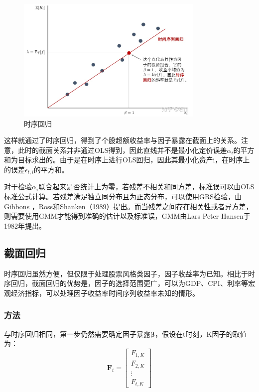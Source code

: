 \documentclass[11pt]{article}
\begin{document}
\begin{figure}[H]
    \centering
    \includegraphics[width=0.8\textwidth]{fig/ts-reg.jpg}
    \caption{时序回归}
    \label{fig:ts-reg}
\end{figure}

这样就通过了时序回归，得到了个股超额收益率与因子暴露在截面上的关系。注意，此时的截面关系并非通过OLS得到，因此直线并不是最小化定价误差$\alpha_i$的平方和为目标求出的。由于是在时序上进行OLS回归，因此其最小化资产i，在时序上的误差$\epsilon_{t,i}$的平方和。

对于检验$\alpha_i$联合起来是否统计上为零，若残差不相关和同方差，标准误可以由OLS标准公式计算。若残差满足独立同分布且为正态分布，可以使用GRS检验，由Gibbons
，Ross和Shanken（1989）提出。而当残差之间存在相关性或者异方差，则需要使用GMM才能得到准确的估计以及标准误，GMM由Lars Peter Hansen于1982年提出。

\subsection{截面回归}

时序回归虽然方便，但仅限于处理股票风格类因子，因子收益率为已知。相比于时序回归，截面回归的优势是，因子的选择范围更广，可以为GDP、CPI、利率等宏观经济指标，可以处理因子收益率时间序列收益率未知的情形。

\subsubsection{方法}

与时序回归相同，第一步仍然需要确定因子暴露$\bm{\beta}$，假设在t时刻，K因子的取值为：
\begin{equation*}
    \bm{F}_t =
    \begin{bmatrix}
        F_{1,K} \\
        F_{2,K} \\
        \vdots \\
        F_{t,K} 
    \end{bmatrix}
\end{equation*}
\end{document}
